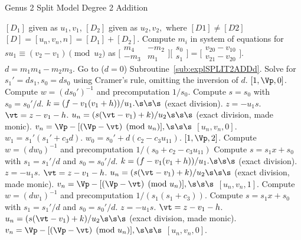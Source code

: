 \begin{algorithm}[htbp]
\caption{Genus 2 Split Model Degree 2 Addition \label{alg:explSPLIT2ADD}}
\begin{algorithmic} [1]
\Require $[D_1]$ given as $u_1,v_1$, $[D_2]$ given as $u_2,v_2,$ where  $[D1] \not = [D2]$ \smallskip
\Ensure $[D] = [u_n,v_n,n] = [D_1] + [D_2] $.
\algrule
\vspace{-2pt}
\State Compute $m_i$ in system of equations for $su_1\equiv (v_2 - v_1) \pmod{u_2}$ as $ \bigl[ \begin{smallmatrix} m_4 & -m_2\\ -m_3 & m_1\end{smallmatrix}\bigr] 
\bigl[ \begin{smallmatrix} s_0\\ s_1 \end{smallmatrix} \bigr ] = \bigl[ \begin{smallmatrix}v_{20} - v_{10} \\  v_{21} - v_{20}\end{smallmatrix} \bigr ]$.
\State $d = m_1m_4 - m_2m_3$.
 \hspace{2pt} Go to ($d = 0$) Subroutine~\ref{sub:explSPLIT2ADDd}.
\EndIf
\State Solve for $s_1' = ds_1, s_0 = ds_0$ using Cramer's rule, omitting the inversion of $d$.
     \Return $[1,\Vp,0]$.
    \Else 
        \State Compute $w = (ds_0')^{-1}$ and precomputation $1/s_0$. 
        \State Compute $s = s_0$ with $s_0 = s_0'/d$.
        \State $k = (f - v_1(v_1 + h))/u_1. \s\s\s$ (exact division).
        \State $z = -u_1s$.
        \State $\vt = z - v_1 - h$.
        \State $u_n = (s(\vt - v_1) + k)/u_2 \s\s\s$ (exact division, made monic).
        \State $v_n = \Vp - [(\Vp - \vt) \pmod{u_n}], \s\s\s$ \Return $[u_n,v_n,0]$.
    \EndIf
\EndIf
\State $w_1 = s_1'(s_1' + c_3d)$.
    \State $w_0 = s_0' + d(c_2 - c_3u_{11})$.
     \Return $[1,\Vp,2]$.
    \Else 
        \State Compute $w = (dw_0)^{-1}$ and precomputation $1/(s_0 + c_2 - c_3u_{11})$ 
        \State Compute $s = s_1x + s_0$ with $s_1 = s_1'/d$ and $s_0 = s_0'/d$.
        \State $k = (f - v_1(v_1 + h))/u_1. \s\s\s$ (exact division).   
        \State $z = -u_1s$.
        \State $\vt = z - v_1 - h$.
        \State $u_n = (s(\vt - v_1) + k)/u_2 \s\s\s$ (exact division, made monic).
        \State $v_n = \Vp - [(\Vp - \vt) \pmod{u_n}], \s\s\s$ \Return $[u_n,v_n,1]$.
    \EndIf
\EndIf
\State Compute $w = (dw_1)^{-1}$ and precomputation $1/(s_1(s_1 + c_3))$.
\State Compute $s = s_1x + s_0$ with $s_1 = s_1'/d$ and $s_0 = s_0'/d$.
\State $z = -u_1s$.
\State $\vt = z - v_1 - h$.
\State $u_n = (s(\vt - v_1) + k)/u_2 \s\s\s$ (exact division, made monic).
\State $v_n = \Vp - [(\Vp - \vt) \pmod{u_n}], \s\s\s$ \Return $[u_n,v_n,0]$.
\vspace{-2pt}
\end{algorithmic}
\end{algorithm}

